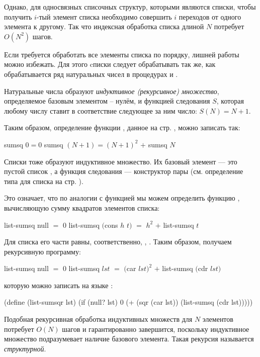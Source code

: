 Однако, для односвязных списочных структур, которыми являются списки, чтобы получить $i$-тый элемент списка необходимо совершить $i$ переходов от одного элемента к другому. Так что индексная обработка списка длиной $N$ потребует $O(N^2)$ шагов.

Если требуется обработать все элементы списка по порядку, лишней работы можно избежать. Для этого cписки следует обрабатывать так же, как обрабатывается ряд натуральных чисел в процедурах  и . 

Натуральные числа образуют \emph{индуктивное (рекурсивное) множество}, определяемое базовым элементом -- нулём, и функцией следования $S$, которая любому числу ставит в соответствие следующее за ним число: $S(N)=N+1$. 

Таким образом, определение функции , данное на стр. \pageref{sumsq}, можно записать так:

\begin{SchemeCode}
  sumsq $0 = 0$
  sumsq $(N + 1) = (N+1)^2$ $+$ sumsq $N$
\end{SchemeCode}

Списки тоже образуют индуктивное множество. Их базовый элемент --- это пустой список , а функция следования --- конструктор пары  (см. определение типа для списка на стр. \pageref{list-type}).

Это означает, что по аналогии с функцией  мы можем определить функцию , вычисляющую сумму квадратов элементов списка:

\begin{SchemeCode}
  list-sumsq null $=$ $0$
  list-sumsq $($cons $h$ $t)$ $=$ $h^2$ $+$ list-sumsq $t$
\end{SchemeCode}

Для списка  его части равны, соответственно, , . Таким образом, получаем рекурсивную программу:

\begin{SchemeCode}
  list-sumsq null $=$ $0$
  list-sumsq $lst$ $=$ $($car $lst)^2$ $+$ list-sumsq $($cdr $lst)$
\end{SchemeCode}
которую можно записать на языке \Scheme:
\begin{SchemeCode}[emph={lst}]
(define (list-sumsqr lst)
  (if (null? lst)
      0
      (+ (sqr (car lst)) (list-sumsq (cdr lst)))))
\end{SchemeCode}

Подобная рекурсивная обработка индуктивных множеств для $N$ элементов потребует $O(N)$ шагов и гарантированно завершится, поскольку индуктивное множество подразумевает наличие базового элемента. Такая рекурсия называется \emph{структурной}.

